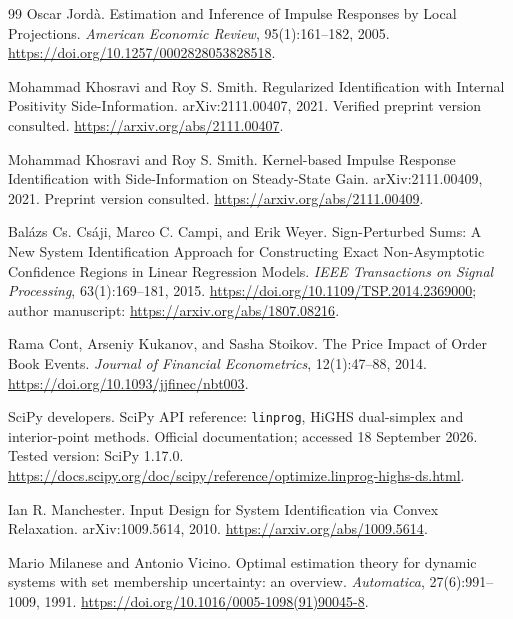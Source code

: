 \documentclass[10pt,twocolumn,letterpaper]{article}
\theoremstyle{definition}
\theoremstyle{remark}
\begin{document}
\begin{thebibliography}{99}
Oscar Jord\`a.
\newblock Estimation and Inference of Impulse Responses by Local Projections.
\newblock \emph{American Economic Review}, 95(1):161--182, 2005.
\newblock \url{https://doi.org/10.1257/0002828053828518}.

Mohammad Khosravi and Roy S. Smith.
\newblock Regularized Identification with Internal Positivity Side-Information.
\newblock arXiv:2111.00407, 2021. Verified preprint version consulted.
\newblock \url{https://arxiv.org/abs/2111.00407}.

Mohammad Khosravi and Roy S. Smith.
\newblock Kernel-based Impulse Response Identification with Side-Information on Steady-State Gain.
\newblock arXiv:2111.00409, 2021. Preprint version consulted.
\newblock \url{https://arxiv.org/abs/2111.00409}.

Bal\'azs Cs. Cs\'aji, Marco C. Campi, and Erik Weyer.
\newblock Sign-Perturbed Sums: A New System Identification Approach for Constructing Exact Non-Asymptotic Confidence Regions in Linear Regression Models.
\newblock \emph{IEEE Transactions on Signal Processing}, 63(1):169--181, 2015.
\newblock \url{https://doi.org/10.1109/TSP.2014.2369000}; author manuscript: \url{https://arxiv.org/abs/1807.08216}.

Rama Cont, Arseniy Kukanov, and Sasha Stoikov.
\newblock The Price Impact of Order Book Events.
\newblock \emph{Journal of Financial Econometrics}, 12(1):47--88, 2014.
\newblock \url{https://doi.org/10.1093/jjfinec/nbt003}.

SciPy developers.
\newblock SciPy API reference: \texttt{linprog}, HiGHS dual-simplex and interior-point methods.
\newblock Official documentation; accessed 18 September 2026. Tested version: SciPy 1.17.0.
\newblock \url{https://docs.scipy.org/doc/scipy/reference/optimize.linprog-highs-ds.html}.

Ian R. Manchester.
\newblock Input Design for System Identification via Convex Relaxation.
\newblock arXiv:1009.5614, 2010.
\newblock \url{https://arxiv.org/abs/1009.5614}.

Mario Milanese and Antonio Vicino.
\newblock Optimal estimation theory for dynamic systems with set membership uncertainty: an overview.
\newblock \emph{Automatica}, 27(6):991--1009, 1991.
\newblock \url{https://doi.org/10.1016/0005-1098(91)90045-8}.


\end{thebibliography}
\end{document}
